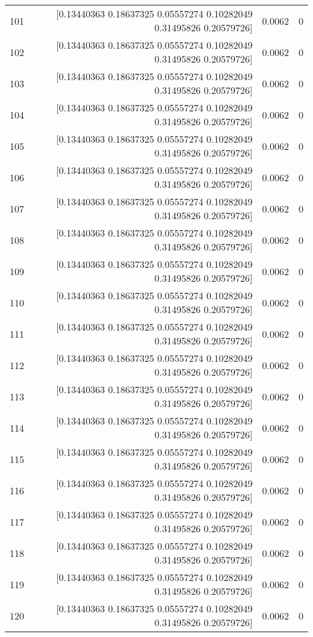 \begin{longtable}{lrrr}
101 & [0.13440363 0.18637325 0.05557274 0.10282049 0.31495826 0.20579726] & 0.0062 & 0 \\
102 & [0.13440363 0.18637325 0.05557274 0.10282049 0.31495826 0.20579726] & 0.0062 & 0 \\
103 & [0.13440363 0.18637325 0.05557274 0.10282049 0.31495826 0.20579726] & 0.0062 & 0 \\
104 & [0.13440363 0.18637325 0.05557274 0.10282049 0.31495826 0.20579726] & 0.0062 & 0 \\
105 & [0.13440363 0.18637325 0.05557274 0.10282049 0.31495826 0.20579726] & 0.0062 & 0 \\
106 & [0.13440363 0.18637325 0.05557274 0.10282049 0.31495826 0.20579726] & 0.0062 & 0 \\
107 & [0.13440363 0.18637325 0.05557274 0.10282049 0.31495826 0.20579726] & 0.0062 & 0 \\
108 & [0.13440363 0.18637325 0.05557274 0.10282049 0.31495826 0.20579726] & 0.0062 & 0 \\
109 & [0.13440363 0.18637325 0.05557274 0.10282049 0.31495826 0.20579726] & 0.0062 & 0 \\
110 & [0.13440363 0.18637325 0.05557274 0.10282049 0.31495826 0.20579726] & 0.0062 & 0 \\
111 & [0.13440363 0.18637325 0.05557274 0.10282049 0.31495826 0.20579726] & 0.0062 & 0 \\
112 & [0.13440363 0.18637325 0.05557274 0.10282049 0.31495826 0.20579726] & 0.0062 & 0 \\
113 & [0.13440363 0.18637325 0.05557274 0.10282049 0.31495826 0.20579726] & 0.0062 & 0 \\
114 & [0.13440363 0.18637325 0.05557274 0.10282049 0.31495826 0.20579726] & 0.0062 & 0 \\
115 & [0.13440363 0.18637325 0.05557274 0.10282049 0.31495826 0.20579726] & 0.0062 & 0 \\
116 & [0.13440363 0.18637325 0.05557274 0.10282049 0.31495826 0.20579726] & 0.0062 & 0 \\
117 & [0.13440363 0.18637325 0.05557274 0.10282049 0.31495826 0.20579726] & 0.0062 & 0 \\
118 & [0.13440363 0.18637325 0.05557274 0.10282049 0.31495826 0.20579726] & 0.0062 & 0 \\
119 & [0.13440363 0.18637325 0.05557274 0.10282049 0.31495826 0.20579726] & 0.0062 & 0 \\
120 & [0.13440363 0.18637325 0.05557274 0.10282049 0.31495826 0.20579726] & 0.0062 & 0 \\

\end{longtable}
